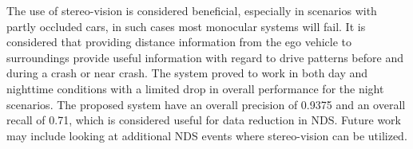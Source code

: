 The use of stereo-vision is considered beneficial, especially in scenarios with partly occluded cars, in such cases most monocular systems will fail. It is considered that providing distance information from the ego vehicle to surroundings provide useful information with regard to drive patterns before and during a crash or near crash. The system proved to work in both day and nighttime conditions with a limited drop in overall performance for the night scenarios. The proposed system have an overall precision of 0.9375 and an overall recall of 0.71, which is considered useful for data reduction in NDS. Future work may include looking at additional NDS events where stereo-vision can be utilized.

